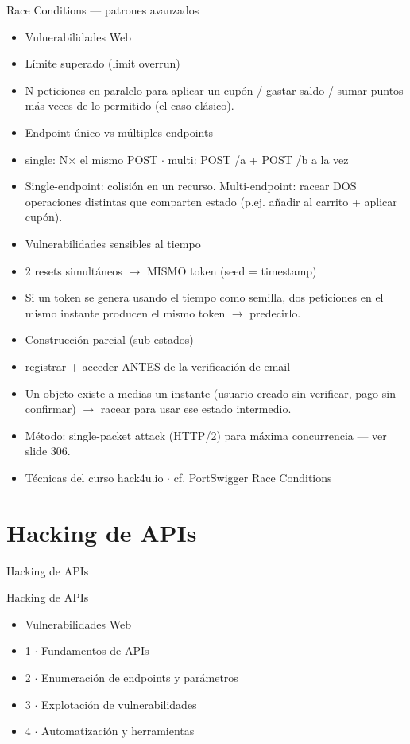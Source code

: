 \documentclass[aspectratio=169,10pt]{beamer}
\begin{document}
\begin{frame}[allowframebreaks]{Race Conditions --- patrones avanzados}
\small
  \begin{itemize}
  \item Vulnerabilidades Web
  \item Límite superado (limit overrun)
  \item N peticiones en paralelo para aplicar un cupón / gastar saldo / sumar puntos más veces de lo permitido (el caso clásico).
  \item Endpoint único vs múltiples endpoints
  \item single: N$\times$ el mismo POST $\cdot$ multi: POST /a + POST /b a la vez
  \item Single-endpoint: colisión en un recurso. Multi-endpoint: racear DOS operaciones distintas que comparten estado (p.ej. añadir al carrito + aplicar cupón).
  \item Vulnerabilidades sensibles al tiempo
  \item 2 resets simultáneos $\rightarrow$ MISMO token (seed = timestamp)
  \item Si un token se genera usando el tiempo como semilla, dos peticiones en el mismo instante producen el mismo token $\rightarrow$ predecirlo.
  \item Construcción parcial (sub-estados)
  \item registrar + acceder ANTES de la verificación de email
  \item Un objeto existe a medias un instante (usuario creado sin verificar, pago sin confirmar) $\rightarrow$ racear para usar ese estado intermedio.
  \item Método: single-packet attack (HTTP/2) para máxima concurrencia --- ver slide 306.
  \item Técnicas del curso hack4u.io $\cdot$ cf. PortSwigger Race Conditions
  \end{itemize}
\end{frame}

\section{Hacking de APIs}

\begin{frame}[allowframebreaks]{Hacking de APIs}
\end{frame}

\begin{frame}[allowframebreaks]{Hacking de APIs}
\small
  \begin{itemize}
  \item Vulnerabilidades Web
  \item 1 $\cdot$ Fundamentos de APIs
  \item 2 $\cdot$ Enumeración de endpoints y parámetros
  \item 3 $\cdot$ Explotación de vulnerabilidades
  \item 4 $\cdot$ Automatización y herramientas
  \end{itemize}
\end{frame}
\end{document}
